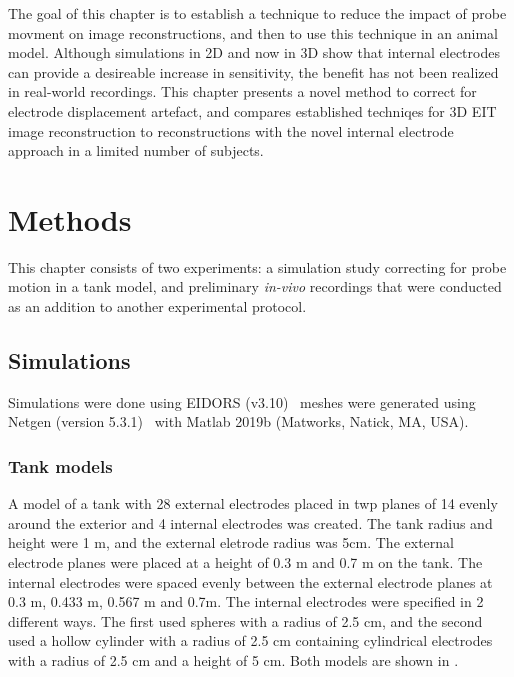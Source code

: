 The goal of this chapter is to establish a technique to reduce the impact of probe movment on 
image reconstructions, and then to use this technique in an animal model. 
Although simulations in 2D and now in 3D show that internal electrodes can provide 
a desireable increase in sensitivity, the benefit has not been realized in real-world
recordings. 
This chapter presents a novel method to correct for electrode displacement artefact, 
and compares established techniqes for 3D EIT image reconstruction 
to reconstructions with the novel internal electrode approach in a limited number of 
subjects.

\section{Methods}
This chapter consists of two experiments: a simulation study correcting for probe motion 
in a tank model, and preliminary \emph{in-vivo} recordings that were conducted as an 
addition to another experimental protocol. 

\subsection{Simulations}
Simulations were done using EIDORS (v3.10)~\parencite{adler_eidors_2017}
meshes were generated using Netgen (version 5.3.1)~\parencite{schoberl_netgen_1997}
with Matlab 2019b (Matworks, Natick, MA, USA).

\subsubsection{Tank models}
A model of a tank with 28 external electrodes placed in twp planes of 14
evenly around the exterior
and 4 internal electrodes was created. 
The tank radius and height were 1 m, and the external eletrode radius was 5cm. 
The external electrode planes were placed at a height of 0.3 m and 0.7 m on the tank. 
The internal electrodes were spaced evenly between the external electrode planes 
at 0.3 m, 0.433 m, 0.567 m and 0.7m. The internal electrodes were specified in 
2 different ways. The first used spheres with a radius of 2.5 cm, and the second 
used a hollow cylinder with a radius of 2.5 cm containing cylindrical electrodes
with a radius of 2.5 cm and a height of 5 cm. 
Both models are shown in .

